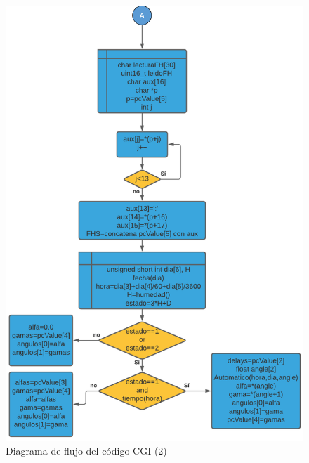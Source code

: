 \begin{figure}[H]
	\centering
	\includegraphics[width=\columnwidth]{imagenes/Diagrama CGI 2}
	\caption{Diagrama de flujo del código CGI (2)}
	\label{fig:dia_flujCGI2}
\end{figure}

